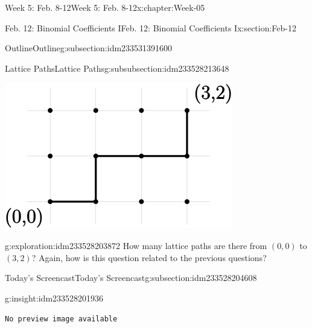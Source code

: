 \documentclass[oneside,10pt,]{book}
\newcommand{\mono}[1]{\texttt{#1}}
\numberwithin{equation}{section}
\newlength{\qrsize}
\newlength{\previewwidth}
\begin{document}
\begin{chapterptx}{Week 5: Feb. 8-12}{}{Week 5: Feb. 8-12}{}{}{x:chapter:Week-05}
\begin{sectionptx}{Feb. 12: Binomial Coefficients I}{}{Feb. 12: Binomial Coefficients I}{}{}{x:section:Feb-12}
\begin{subsectionptx}{Outline}{}{Outline}{}{}{g:subsection:idm233531391600}
\begin{subsubsectionptx}{Lattice Paths}{}{Lattice Paths}{}{}{g:subsubsection:idm233528213648}
\begin{sidebyside}{3}{0.0166666666666667}{0.0166666666666667}{0.0333333333333333}
\begin{sbspanel}{0.3}
\includegraphics[width=\linewidth]{./img/lattice-path-3.svg}
\end{sbspanel}%
\end{sidebyside}%
\begin{exploration}{}{g:exploration:idm233528203872}%
How many lattice paths are there from \((0,0)\) to \((3,2)\)? Again, how is this question related to the previous questions?%
\end{exploration}%
\end{subsubsectionptx}
\end{subsectionptx}
%
%
\typeout{************************************************}
\typeout{************************************************}
%
\begin{subsectionptx}{Today's Screencast}{}{Today's Screencast}{}{}{g:subsection:idm233528204608}
\begin{insight}{}{g:insight:idm233528201936}%
\setlength{\qrsize}{9em}
\setlength{\previewwidth}{\linewidth}
\addtolength{\previewwidth}{-\qrsize}
\begin{tcbraster}[raster columns=2, raster column skip=1pt, raster halign=center, raster force size=false, raster left skip=0pt, raster right skip=0pt]%
\begin{tcolorbox}[previewstyle, width=\previewwidth]%
\mono{No preview image available}%
\end{tcolorbox}%
\begin{tcolorbox}[qrstyle]%
[QR LINK]\end{tcolorbox}%
\end{tcbraster}%
\end{insight}
\end{subsectionptx}
%
%
\typeout{************************************************}

\end{sectionptx}
\end{chapterptx}
\end{document}
